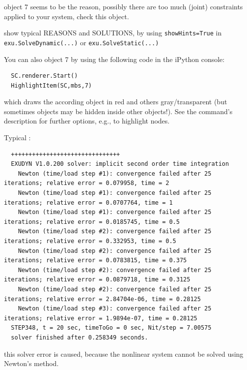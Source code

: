\onlyRST{\rstStartNewLine}
%
\bi
\item[$\ra$] object 7 seems to be the reason, possibly there are too much (joint) constraints applied to your system, check this object.
\item[$\ra$] show typical REASONS and SOLUTIONS, by using \texttt{showHints=True} in \texttt{exu.SolveDynamic(...)} or \texttt{exu.SolveStatic(...)}
\item[$\ra$] You can also  object 7 by using the following code in the iPython console:
\ei
\pythonstyle\begin{lstlisting}
  SC.renderer.Start()
  HighlightItem(SC,mbs,7)
\end{lstlisting}
%
which draws the according object in red and others gray/transparent (but sometimes objects may be hidden inside other objects!). See the command's description for further options, e.g., to highlight nodes.
\vspace{12pt}\\
\item Typical :
\plainlststyle
\begin{lstlisting}
  +++++++++++++++++++++++++++++++
  EXUDYN V1.0.200 solver: implicit second order time integration
    Newton (time/load step #1): convergence failed after 25 iterations; relative error = 0.079958, time = 2
    Newton (time/load step #1): convergence failed after 25 iterations; relative error = 0.0707764, time = 1
    Newton (time/load step #1): convergence failed after 25 iterations; relative error = 0.0185745, time = 0.5
    Newton (time/load step #2): convergence failed after 25 iterations; relative error = 0.332953, time = 0.5
    Newton (time/load step #2): convergence failed after 25 iterations; relative error = 0.0783815, time = 0.375
    Newton (time/load step #2): convergence failed after 25 iterations; relative error = 0.0879718, time = 0.3125
    Newton (time/load step #2): convergence failed after 25 iterations; relative error = 2.84704e-06, time = 0.28125
    Newton (time/load step #3): convergence failed after 25 iterations; relative error = 1.9894e-07, time = 0.28125
  STEP348, t = 20 sec, timeToGo = 0 sec, Nit/step = 7.00575
  solver finished after 0.258349 seconds.
\end{lstlisting}
\onlyRST{\rstStartNewLine}
%
\bi
\item[$\ra$] this solver error is caused, because the nonlinear system cannot be solved using Newton's method.

